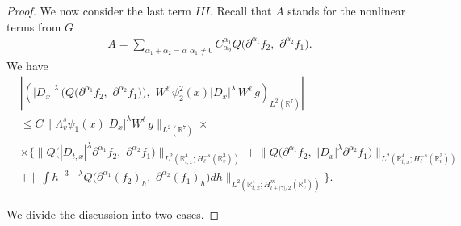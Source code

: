 \documentclass{amsart}[12pt, article]
\begin{document}
\begin{proof}
We now consider  the last term $III$. Recall that $A$ stands for
the nonlinear terms {}from $G$
\begin{eqnarray*}
A=\sum_{\alpha_1+\alpha_2=\alpha\,\, \alpha_1\neq
0}C^{\alpha_1}_{\alpha_2} Q\Big(\partial^{\alpha_1} f_2,\,\,
\partial^{\alpha_2} f_1\Big).
\end{eqnarray*}
We have
\begin{align*}
&\left|\left(|D_{x}|^{\lambda} \, \Big(Q\big(\partial^{\alpha_1}
f_2,\,\,\partial^{\alpha_2} f_1\big)\Big),\,\, W^{\ell}\,
\psi^2_2(x)|D_{x}|^{\lambda} \,  W^{\ell}\,g\right)_{L^2({{{\mathbb R}}}^7)}\right|\\
&\leq C\|\Lambda^{s}_v  \psi_1(x)|D_{x}|^{\lambda}
W^{\ell}\,g\|_{L^2({{{\mathbb R}}}^7)}\times\\
&\times\Big\{\big\|Q\big(|D_{t, x}|^\lambda\partial^{\alpha_1}
f_2,\,\,
\partial^{\alpha_2} f_1\big)\big\|_{L^2({{{\mathbb R}}}^4_{t, x}; H^{-s}_{\ell}({{{\mathbb R}}}^3_v))}
+\big\|Q\big(\partial^{\alpha_1} f_2,\,\, |D_{x}|^\lambda
\partial^{\alpha_2} f_1\big)\big\|_{L^2({{{\mathbb R}}}^4_{t, x};
H^{-s}_{\ell}({{{\mathbb R}}}^3_v))}\\
&+\big\|\int h^{-3-\lambda}Q\big(\partial^{\alpha_1} (f_2)_h,\,\,
\partial^{\alpha_2}(f_1)_h\big) dh\big\|_{L^2({{{\mathbb R}}}^4_{t, x};
H^{m}_{l+|\gamma|/2}({{{\mathbb R}}}^3_v))}\Big\}.
\end{align*}

We divide the discussion into two cases.


\end{proof}
\end{document}
